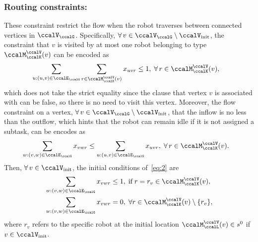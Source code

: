 \documentclass[Afour,sageh,times]{sagej}
\begin{document}
\subsubsection{Routing constraints:} These constraint restrict the flow when the robot traverses between connected vertices in $\ccalV_\ccalG$. Specifically, $\forall\, v \in \ccalV_\ccalG\setminus\ccalV_{\text{init}}$, the constraint that  $v$ is visited by at most one robot belonging to type $\ccalM^\ccalV_{\ccalK}(v)$ can be encoded as
\begingroup\makeatletter\def\f@size{10}\check@mathfonts
\def\maketag@@@#1{\hbox{\m@th\normalsize\normalfont#1}}%
\begin{align}
   & \sum_{u:(u,v)\in \ccalE_\ccalG} \sum_{r\in \ccalM^\ccalV_{\ccalK}(v)} x_{uvr}  \leq 1, \;\forall\, r \in \ccalM^\ccalV_{\ccalK}(v), \label{eq:1}
\end{align}
\endgroup
which does not take the strict equality since the clause that vertex $v$ is associated with can be false, so there is no need to visit this vertex. Moreover, the flow constraint on a vertex, $\forall \,v \in \ccalV_\ccalG\setminus\ccalV_{\text{init}}$, that the inflow is no less than the outflow, which hints that the robot can remain idle if it is not assigned a subtask, can be encodes as
 \begingroup\makeatletter\def\f@size{10}\check@mathfonts
\def\maketag@@@#1{\hbox{\m@th\normalsize\normalfont#1}}%
\begin{align}
& \sum_{w:(v,w)\in \ccalE_\ccalG} x_{vwr}   \leq  \sum_{u:(u,v)\in \ccalE_\ccalG} x_{uvr}, \;\forall\, r \in \ccalM^\ccalV_{\ccalK}(v). \label{eq:2}
\end{align}
\endgroup
Then, $\forall \,v \in \ccalV_{\text{init}}$, the initial conditions of~\eqref{eq:2} are
\begingroup\makeatletter\def\f@size{10}\check@mathfonts
\def\maketag@@@#1{\hbox{\m@th\normalsize\normalfont#1}}%
\begin{subequations}\label{eq:2.5}
  \begin{align}
    & \sum_{w:(v,w)\in \ccalE_\ccalG} x_{vwr}  \leq 1, \;\text{if}\; r = r_v \in \ccalM^\ccalV_{\ccalK}(v), \label{eq:2.5a}\\
    & \sum_{w:(v,w)\in \ccalE_\ccalG} x_{vwr}  = 0, \;\forall r \in \ccalM^\ccalV_{\ccalK}(v)\setminus \{ r_v\}, \label{eq:2.5b}
  \end{align}
\end{subequations}
\endgroup
where $r_v$ refers to the specific robot at the initial location $\ccalM^\ccalV_{\ccalL}(v)\in s^0$ if $v \in \ccalV_{\text{init}}$.
\end{document}
